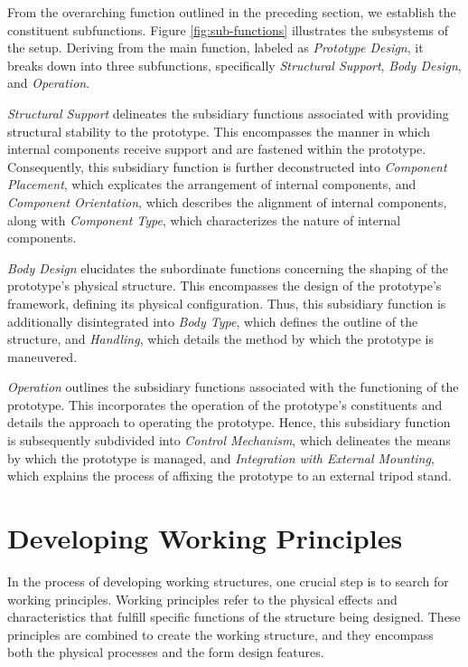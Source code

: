 From the overarching function outlined in the preceding section, we establish the constituent subfunctions. Figure \ref{fig:sub-functions} illustrates the subsystems of the setup. Deriving from the main function, labeled as \textit{Prototype Design}, it breaks down into three subfunctions, specifically \textit{Structural Support}, \textit{Body Design}, and \textit{Operation}.

\textit{Structural Support} delineates the subsidiary functions associated with providing structural stability to the prototype. This encompasses the manner in which internal components receive support and are fastened within the prototype. Consequently, this subsidiary function is further deconstructed into \textit{Component Placement}, which explicates the arrangement of internal components, and \textit{Component Orientation}, which describes the alignment of internal components, along with \textit{Component Type}, which characterizes the nature of internal components.

\textit{Body Design} elucidates the subordinate functions concerning the shaping of the prototype's physical structure. This encompasses the design of the prototype's framework, defining its physical configuration. Thus, this subsidiary function is additionally disintegrated into \textit{Body Type}, which defines the outline of the structure, and \textit{Handling}, which details the method by which the prototype is maneuvered.

\textit{Operation} outlines the subsidiary functions associated with the functioning of the prototype. This incorporates the operation of the prototype's constituents and details the approach to operating the prototype. Hence, this subsidiary function is subsequently subdivided into \textit{Control Mechanism}, which delineates the means by which the prototype is managed, and \textit{Integration with External Mounting}, which explains the process of affixing the prototype to an external tripod stand.

\section{Developing Working Principles}

In the process of developing working structures, one crucial step is to search for working principles. Working principles refer to the physical effects and characteristics that fulfill specific functions of the structure being designed. These principles are combined to create the working structure, and they encompass both the physical processes and the form design features.

